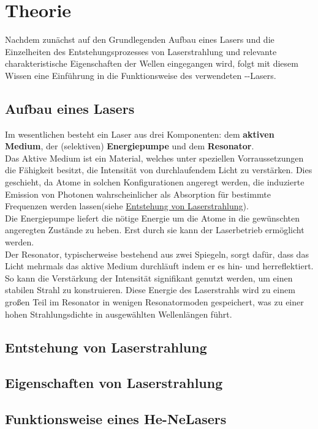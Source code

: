 \section{Theorie}\label{sec:theorie}
Nachdem zunächst auf den Grundlegenden Aufbau eines Lasers und die Einzelheiten des Entstehungsprozesses von Laserstrahlung und relevante charakteristische Eigenschaften der Wellen eingegangen wird, folgt mit diesem Wissen eine Einführung in die Funktionsweise des verwendeten --Lasers.
\subsection{Aufbau eines Lasers}
Im wesentlichen besteht ein Laser aus drei Komponenten: dem \textbf{aktiven Medium}, der (selektiven) \textbf{Energiepumpe} und dem \textbf{Resonator}.\\
Das Aktive Medium ist ein Material, welches unter speziellen Vorraussetzungen die Fähigkeit besitzt, die Intensität von durchlaufendem Licht zu verstärken. Dies geschieht, da Atome in solchen Konfigurationen angeregt werden, die induzierte Emission von Photonen wahrscheinlicher als Absorption für bestimmte Frequenzen werden lassen(siehe \hyperref[subsec:entstehung]{Entstehung von Laserstrahlung}).\\
Die Energiepumpe liefert die nötige Energie um die Atome in die gewünschten angeregten Zustände zu heben. Erst durch sie kann der Laserbetrieb ermöglicht werden.\\
Der Resonator, typischerweise bestehend aus zwei Spiegeln, sorgt dafür, dass das Licht mehrmals das aktive Medium durchläuft indem er es hin- und herreflektiert. So kann die Verstärkung der Intensität signifikant genutzt werden, um einen stabilen Strahl zu konstruieren. Diese Energie des Laserstrahls wird zu einem großen Teil im Resonator in wenigen Resonatormoden gespeichert, was zu einer hohen Strahlungsdichte in ausgewählten Wellenlängen führt.\cite{Demtroeder} 
\subsection{Entstehung von Laserstrahlung}\label{subsec:entstehung}

\subsection{Eigenschaften von Laserstrahlung}
\subsection{Funktionsweise eines He-NeLasers}